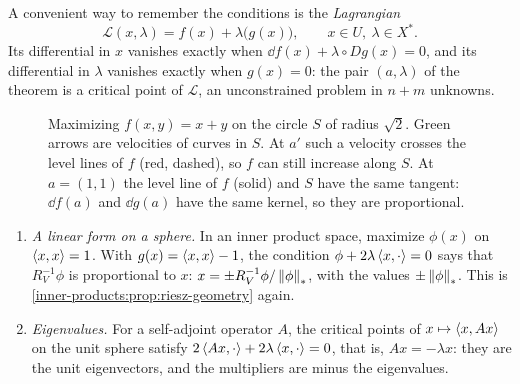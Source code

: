 \begin{notechapter}
A convenient way to remember the conditions is the \emph{Lagrangian}
\[
  \mathcal L(x, \lambda) = f(x) + \lambda\bigl(g(x)\bigr) ,
  \qquad x\in U,\ \lambda\in X^* .
\]
Its differential in $x$ vanishes exactly when
$\dd f(x) + \lambda\circ Dg(x) = 0$, and its differential in $\lambda$
vanishes exactly when $g(x) = 0$: the pair $(a, \lambda)$ of the theorem
is a critical point of $\mathcal L$, an unconstrained problem in $n + m$
unknowns.

\begin{figure}[ht]
\centering
{}
\caption{Maximizing $f(x, y) = x + y$ on the circle $S$ of radius
$\sqrt2$. Green arrows are velocities of curves in $S$. At $a' $ such a
velocity crosses the level lines of $f$ (red, dashed), so $f$ can still
increase along $S$. At $a = (1, 1)$ the level line of $f$ (solid) and $S$
have the same tangent: $\dd f(a)$ and $\dd g(a)$ have the same kernel, so
they are proportional.}
\label{constrained-optimization:fig:lagrange}
\end{figure}

\begin{example}\label{constrained-optimization:ex:first}
\begin{enumerate}[nosep]
  \item \emph{A linear form on a sphere.} In an inner product space,
        maximize $\phi(x)$ on $\left\langle x, x \right\rangle = 1$. With
        $g(x) = \left\langle x, x \right\rangle - 1$, the condition
        $\phi + 2\lambda\left\langle x, \cdot \right\rangle = 0$ says that $R_V^{-1}\phi$ is
        proportional to $x$: $x = \pm R_V^{-1}\phi/\left\|\phi\right\|_*$, with
        the values $\pm\left\|\phi\right\|_*$. This is
        \cref{inner-products:prop:riesz-geometry} again.
  \item \emph{Eigenvalues.} For a self-adjoint operator $A$, the critical
        points of $x\mapsto\left\langle x, Ax \right\rangle$ on the unit sphere satisfy
        $2\left\langle Ax, \cdot \right\rangle + 2\lambda\left\langle x, \cdot \right\rangle = 0$, that is,
        $Ax = -\lambda x$: they are the unit eigenvectors, and the
        multipliers are minus the eigenvalues.
\end{enumerate}
\end{example}


\end{notechapter}
